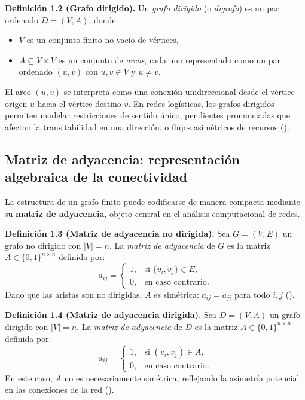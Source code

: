 \documentclass[
  spanish,
  us-letterpaper,
]{scrreprt}
\providecommand{\tightlist}{%
  \setlength{\itemsep}{0pt}\setlength{\parskip}{0pt}}
\numberwithin{equation}{section}
\begin{document}
\textbf{Definición 1.2 (Grafo dirigido).} Un \emph{grafo dirigido} (o
\emph{digrafo}) es un par ordenado \(D = (V, A)\), donde:

\begin{itemize}
\tightlist
\item
  \(V\) es un conjunto finito no vacío de vértices,
\item
  \(A \subseteq V \times V\) es un conjunto de \emph{arcos}, cada uno
  representado como un par ordenado \((u,v)\) con \(u, v \in V\) y
  \(u \neq v\).
\end{itemize}

El arco \((u,v)\) se interpreta como una conexión unidireccional desde
el vértice origen \(u\) hacia el vértice destino \(v\). En redes
logísticas, los grafos dirigidos permiten modelar restricciones de
sentido único, pendientes pronunciadas que afectan la transitabilidad en
una dirección, o flujos asimétricos de recursos
().

\subsection{Matriz de adyacencia: representación algebraica de la
conectividad}\label{sec-adyacencia}

La estructura de un grafo finito puede codificarse de manera compacta
mediante su \textbf{matriz de adyacencia}, objeto central en el análisis
computacional de redes.

\textbf{Definición 1.3 (Matriz de adyacencia no dirigida).} Sea
\(G = (V, E)\) un grafo no dirigido con \(|V| = n\). La \emph{matriz de
adyacencia} de \(G\) es la matriz \(A \in \{0,1\}^{n \times n}\)
definida por: \[
a_{ij} = 
\begin{cases}
1, & \text{si } \{v_i, v_j\} \in E, \\
0, & \text{en caso contrario}.
\end{cases}
\] Dado que las aristas son no dirigidas, \(A\) es simétrica:
\(a_{ij} = a_{ji}\) para todo \(i,j\)
().

\textbf{Definición 1.4 (Matriz de adyacencia dirigida).} Sea
\(D = (V, A)\) un grafo dirigido con \(|V| = n\). La \emph{matriz de
adyacencia} de \(D\) es la matriz \(A \in \{0,1\}^{n \times n}\)
definida por: \[
a_{ij} = 
\begin{cases}
1, & \text{si } (v_i, v_j) \in A, \\
0, & \text{en caso contrario}.
\end{cases}
\] En este caso, \(A\) no es necesariamente simétrica, reflejando la
asimetría potencial en las conexiones de la red
().
\end{document}
